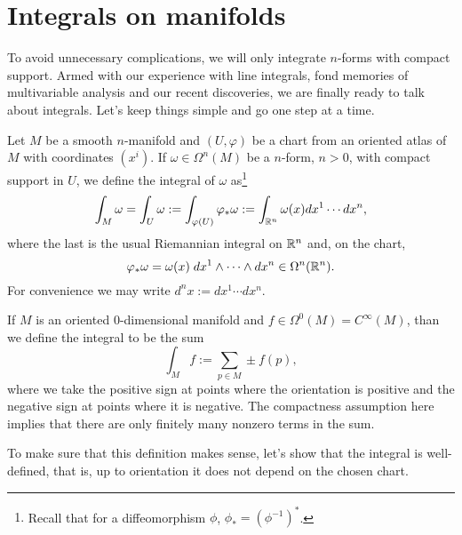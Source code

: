 \section{Integrals on manifolds}

To avoid unnecessary complications, we will only integrate $n$-forms with compact support.
Armed with our experience with line integrals, fond memories of multivariable analysis and our recent discoveries, we are finally ready to talk about integrals.
Let's keep things simple and go one step at a time.

\begin{definition}\label{def:intnform:chart}
  Let $M$ be a smooth $n$-manifold and $(U,\varphi)$ be a chart from an oriented atlas of $M$ with coordinates $(x^i)$.
  If $\omega\in\Omega^n(M)$ be a $n$-form, $n > 0$, with compact support in $U$, we define the integral of $\omega$ as\footnote{Recall that for a diffeomorphism $\phi$, $\phi_* = (\phi^{-1})^*$.}
  \begin{equation}
    \int_M \omega = \int_U \omega := \int_{\varphi(U)} \varphi_*\omega := \int_{\mathbb{R}^n} \omega(x) d x^1\cdots dx^n,
  \end{equation}
  where the last is the usual Riemannian integral on $\mathbb{R}^n$ and, on the chart,
  \begin{equation}
    \varphi_*\omega = \omega(x)\; dx^{1}\wedge \cdots\wedge dx^{n}\in\Omega^n(\mathbb{R}^n).
  \end{equation}
  For convenience we may write $d^n x := dx^1 \cdots dx^n$.

  If $M$ is an oriented $0$-dimensional manifold and $f\in\Omega^0(M) = C^\infty(M)$, than we define the integral to be the sum
  \begin{equation}
    \int_M f := \sum_{p\in M} \pm f(p),
  \end{equation}
  where we take the positive sign at points where the orientation is positive and the negative sign at points where it is negative.
  The compactness assumption here implies that there are only finitely many nonzero terms in the sum.
\end{definition}

To make sure that this definition makes sense, let's show that the integral is well-defined, that is, up to orientation it does not depend on the chosen chart.

